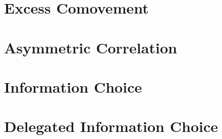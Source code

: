 

\section{Excess Comovement}

\section{Asymmetric Correlation}

\section{Information Choice}

\section{Delegated Information Choice}
